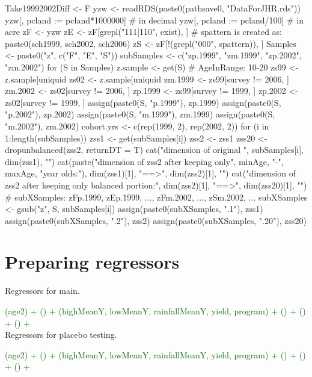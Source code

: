 \begin{Schunk}
\begin{Sinput}
Take19992002Diff <- F
yzw <- readRDS(paste0(pathsave0, "DataForJHR.rds"))
yzw[, pcland := pcland*1000000] # in decimal 
yzw[, pcland := pcland/100] # in acre
zF <- yzw
zE <- zF[grepl("111|110", exist), ]
# spattern is created as: paste0(sch1999, sch2002, sch2006)
zS <- zF[!(grepl("000", spattern)), ]
Samples <- paste0("z", c("F", "E", "S"))
subSamples <- c("zp.1999", "zm.1999", "zp.2002", "zm.2002")
for (S in Samples) {
  z.sample <- get(S)
  # AgeInRange: 10-20
  zs99 <- z.sample[uniquid %in% uniquid[AgeInRangeR1 == 1], ]
  zs02 <- z.sample[uniquid %in% uniquid[AgeInRangeR2 == 1], ]
  zm.1999 <- zs99[survey != 2006, ]
  zm.2002 <- zs02[survey != 2006, ]
  zp.1999 <- zs99[survey != 1999, ]
  zp.2002 <- zs02[survey != 1999, ]
  assign(paste0(S, "p.1999"), zp.1999)
  assign(paste0(S, "p.2002"), zp.2002)
  assign(paste0(S, "m.1999"), zm.1999)
  assign(paste0(S, "m.2002"), zm.2002)
  cohort.yrs <- c(rep(1999, 2), rep(2002, 2))
  for (i in 1:length(subSamples)) {
    zss1 <- get(subSamples[i])
    zss2 <- zss1
    zss20 <- dropunbalanced(zss2, returnDT = T)
    cat("dimension of original ", subSamples[i], dim(zss1), "\n")
    cat(paste("dimension of zss2 after keeping only", minAge, "-", maxAge, "year olds:"), 
    dim(zss1)[1], "==>", dim(zss2)[1], "\n")
    cat("dimension of zss2 after keeping only balanced portion:", 
    dim(zss2)[1], "==>", dim(zss20)[1], "\n")
    # subXSamples: zFp.1999, zEp.1999, ..., zFm.2002, ..., zSm.2002, ...
    subXSamples <- gsub("z", S, subSamples[i])
    assign(paste0(subXSamples, ".1"), zss1)
    assign(paste0(subXSamples, ".2"), zss2)
    assign(paste0(subXSamples, ".20"), zss20)
  }
}
\end{Sinput}
\end{Schunk}



\section{Preparing regressors}





Regressors for main. \gobblepars

\textcolor{darkgreen}{\textsf{\footnotesize (age2) + () + (highMeanY, lowMeanY, rainfallMeanY, yield, program) + () + () + () +}}\\ 
Regressors for placebo testing. \gobblepars 

\textcolor{darkgreen}{\textsf{\footnotesize (age2) + () + (highMeanY, lowMeanY, rainfallMeanY, yield, program) + () + () + () +}}\\ 

